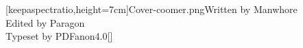 \documentclass[a4paper,12pt,american,oneside]{../aidg} %
\begin{document}
[keepaspectratio,height=7cm]{Cover-coomer.png}{Written by Manwhore\\Edited by Paragon\\Typeset by PDFanon}{4.0}[]

\tcolortoc



\nocite{*}
\clearpage
\printbibliography[title={Resources},subtype=annoted]
\clearpage


\end{document}
